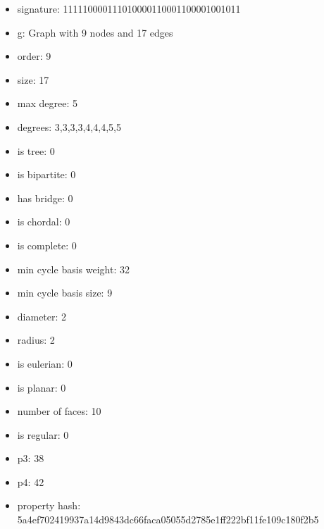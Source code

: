 \newpage
\begin{figure}
\end{figure}
\begin{itemize}
\item signature: 111110000111010000110001100001001011
\item g: Graph with 9 nodes and 17 edges
\item order: 9
\item size: 17
\item max degree: 5
\item degrees: 3,3,3,3,4,4,4,5,5
\item is tree: 0
\item is bipartite: 0
\item has bridge: 0
\item is chordal: 0
\item is complete: 0
\item min cycle basis weight: 32
\item min cycle basis size: 9
\item diameter: 2
\item radius: 2
\item is eulerian: 0
\item is planar: 0
\item number of faces: 10
\item is regular: 0
\item p3: 38
\item p4: 42
\item property hash: 5a4ef702419937a14d9843dc66faca05055d2785e1ff222bf11fe109c180f2b5
\end{itemize}
